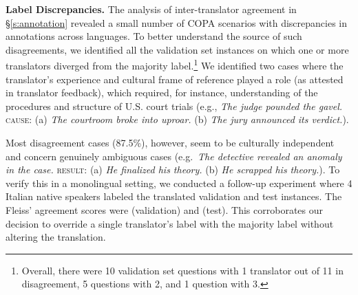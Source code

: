 \documentclass[11pt,a4paper]{article}
\begin{document}
\iffalse
\begin{table*}[!t]
    \centering
    \def\arraystretch{0.91}
    {\footnotesize
    \begin{tabularx}{1.0\textwidth}{c ccYY}
\toprule
\textsc{id} & \textsc{premise} & \textsc{question} & \textsc{choice 1} & \textsc{choice 2} \\
\cmidrule(lr){2-5}
52 & \textit{The detective revealed an anomaly in the case.}	& R(esult) &	\textit{He finalized his theory.} & \textit{He scrapped his theory.} \\
92 & \textit{The man received a parking ticket.} & C(ause) & \textit{He parallel parked on the street.} & \textit{The parking meter expired.} \\
\bottomrule
    \end{tabularx}}\vspace{-1.5mm}
    \caption{Examples in the development set with highest disagreement.}
    \label{tab:maxdisagree}
    \vspace{-1.5mm}
\end{table*}
\fi










\vspace{1.4mm}
\noindent \textbf{Label Discrepancies.}
The analysis of inter-translator agreement in \S\ref{s:annotation} revealed a small number of COPA scenarios with discrepancies in annotations across languages. To better understand the source of such disagreements, we identified all the validation set instances on which one or more translators diverged from the majority label.\footnote{Overall, there were 10 validation set questions with 1 translator out of 11 in disagreement, 5 questions with 2, and 1 question with 3. } We identified two cases where the translator's experience and cultural frame of reference played a role (as attested in translator feedback), which required, for instance, understanding of the procedures and structure of U.S. court trials (e.g., \textit{The judge pounded the gavel.} \textsc{cause}: (a) \textit{The courtroom broke into uproar.} (b) \textit{The jury announced its verdict.}). 

Most disagreement cases (87.5\%), however, seem to be culturally independent and concern genuinely ambiguous cases (e.g.\ \textit{The detective revealed an anomaly in the case.} \textsc{result}: (a) \textit{He finalized his theory.} (b) \textit{He scrapped his theory.}). To verify this in a monolingual setting, we conducted a follow-up experiment where 4 Italian native speakers labeled the translated validation and test instances. The Fleiss'  agreement scores were  (validation) and  (test).
This corroborates 
our decision to override a single translator's label with the majority label without altering the translation. 
\end{document}
